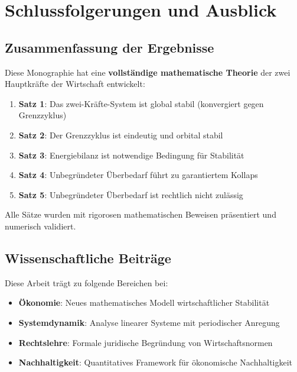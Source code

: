 \documentclass[a4paper,11pt]{report}
\theoremstyle{definition}
\begin{document}
\chapter{Schlussfolgerungen und Ausblick}

\section{Zusammenfassung der Ergebnisse}

Diese Monographie hat eine \textbf{vollständige mathematische Theorie} der zwei Hauptkräfte der Wirtschaft entwickelt:

\begin{enumerate}
    \item \textbf{Satz 1}: Das zwei-Kräfte-System ist global stabil (konvergiert gegen Grenzzyklus)
    \item \textbf{Satz 2}: Der Grenzzyklus ist eindeutig und orbital stabil
    \item \textbf{Satz 3}: Energiebilanz ist notwendige Bedingung für Stabilität
    \item \textbf{Satz 4}: Unbegründeter Überbedarf führt zu garantiertem Kollaps
    \item \textbf{Satz 5}: Unbegründeter Überbedarf ist rechtlich nicht zulässig
\end{enumerate}

Alle Sätze wurden mit rigorosen mathematischen Beweisen präsentiert und numerisch validiert.

\section{Wissenschaftliche Beiträge}

Diese Arbeit trägt zu folgende Bereichen bei:

\begin{itemize}
    \item \textbf{Ökonomie}: Neues mathematisches Modell wirtschaftlicher Stabilität
    \item \textbf{Systemdynamik}: Analyse linearer Systeme mit periodischer Anregung
    \item \textbf{Rechtslehre}: Formale juridische Begründung von Wirtschaftsnormen
    \item \textbf{Nachhaltigkeit}: Quantitatives Framework für ökonomische Nachhaltigkeit
\end{itemize}
\end{document}

